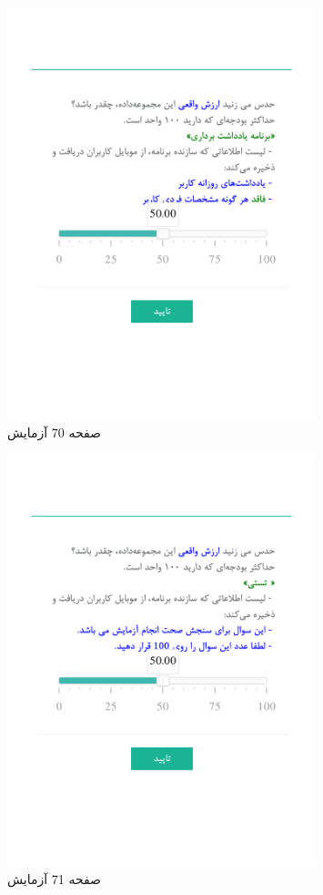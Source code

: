 { 
\begin{figure}[htpb]
\centering
\includegraphics[width=0.8\textwidth]{./img/Task70.png/}
\caption{ صفحه 70 آزمایش }
\label{fig:Task70}
\end{figure}
 
 
\begin{figure}[htpb]
\centering
\includegraphics[width=0.8\textwidth]{./img/Task71.png/}
\caption{ صفحه 71 آزمایش }
\label{fig:Task71}
\end{figure}
 
}
